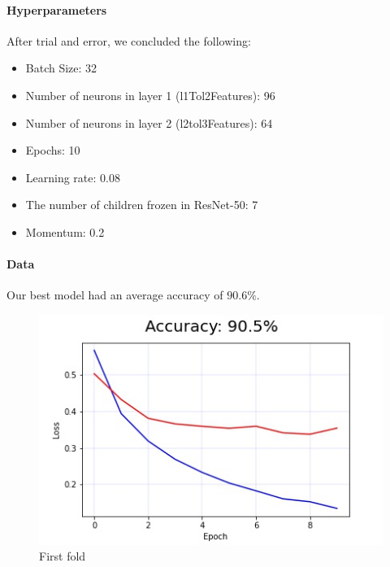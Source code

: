\documentclass[11pt]{article}
\begin{document}
\paragraph{\noindent\textbf{\LARGE{Hyperparameters}}}
\begin{flushleft}
    After trial and error, we concluded the following:
\begin{itemize}
    \item Batch Size: 32
    \item Number of neurons in layer 1 (l1Tol2Features): 96
    \item Number of neurons in layer 2 (l2tol3Features): 64
    \item Epochs: 10
    \item Learning rate: 0.08
    \item The number of children frozen in ResNet-50: 7
    \item Momentum: 0.2
\end{itemize}    
\end{flushleft} 

\paragraph{\noindent\textbf{\LARGE{Data}}}
\begin{flushleft}
    Our best model had an average accuracy of $ 90.6 \% $.
\end{flushleft} 

\begin{figure}[H]
    \centerline{\includegraphics[scale=.5]{image1.jpg}}
    \caption{First fold}
    \label{fig}
\end{figure}
\end{document}
